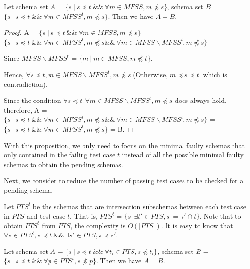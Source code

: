 
\begin{proposition}\label{pro:mfssintequal}
Let schema set $A$ = $\{ s\ |\ s \preceq t\ \&\&\ \forall m \in MFSS,  m \npreceq s \}$,  schema set $B$ = $\{ s\ |\ s \preceq t\ \&\&\ \forall m \in MFSS^{t},  m \npreceq s \}$. Then we have $A = B$.
\end{proposition}

\begin{proof}

A = $\{ s\ |\  s \preceq t\ \&\&\ \forall m \in MFSS,  m \npreceq s \}$
 =
$\{ s\ |\  s \preceq t\ \&\&\ \forall m \in MFSS^{t},  m \npreceq s \&\&\   \forall m \in MFSS \backslash MFSS^{t},  m \npreceq s  \}$

Since $MFSS \backslash MFSS^{t}$ = $\{ m \ | \ m \in MFSS, m \npreceq t \}$.

Hence, $\forall s \preceq t, m \in MFSS \backslash MFSS^{t},  m \npreceq s$ (Otherwise, $m \preceq s \preceq t$, which is contradiction).

Since the condition $\forall s \preceq t, \forall m \in MFSS \backslash MFSS^{t},  m \npreceq s $ does always hold, therefore, A =
$\{ s\ |\  s \preceq t\ \&\&\ \forall m \in MFSS^{t},  m \npreceq s \&\&\   \forall m \in MFSS \backslash MFSS^{t},  m \npreceq s  \}$  =
$\{ s\ |\  s \preceq t\ \&\&\ \forall m \in MFSS^{t},  m \npreceq s \}$ = B.
\end{proof}

With this proposition, we only need to focus on the minimal faulty schemas that only contained in the failing test case $t$ instead of all the possible minimal faulty schemas to obtain the pending schemas. %

Next, we consider to reduce the number of passing test cases to be checked for a pending schema.

Let $PTS^{t}$ be the schemas that are intersection subschemas between each test case in $PTS$ and test case $t$. That is, $PTS^{t}$ = $\{ s\ | \exists t' \in  PTS, s\ =\ t' \cap t \}$. Note that to obtain $PTS^{t}$ from $PTS$, the complexity is $O(|PTS|)$.  It is easy to know that $\forall s \in PTS^{t}, s \preceq t \ \&\& \ \exists s' \in PTS, s \preceq s'$.


\begin{proposition}\label{pro:healthysintequal}
Let schema set $A$ = $\{ s\ |\ s \preceq t\ \&\&\  \forall t_{i} \in PTS, s \npreceq t_{i} \} $,  schema set $B$ = $\{ s\ |\ s \preceq t\ \&\&\ \forall p \in PTS^{t}, s \npreceq p \}$. Then we have $A = B$.
\end{proposition}

